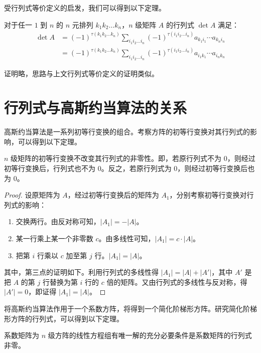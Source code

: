 受行列式等价定义的启发，我们可以得到以下定理。

\begin{theorem}
	对于任一 $1$ 到 $n$ 的 $n$ 元排列 $k_1 k_2 \ldots k_n$，$n$ 级矩阵 $A$ 的行列式 $\det A$ 满足：
	$$
	\begin{aligned}
		\det A &= (-1)^{\tau(k_1 k_2 \ldots k_n)} \sum\limits_{i_1 i_2 \ldots i_n} (-1)^{\tau (i_1 i_2 \ldots i_n)} a_{k_1 i_1} \cdots a_{k_n i_n}
		\\&=
		(-1)^{\tau(k_1 k_2 \ldots k_n)} \sum\limits_{i_1 i_2 \ldots i_n} (-1)^{\tau (i_1 i_2 \ldots i_n)} a_{i_1 k_1} \cdots a_{i_n k_n}
	\end{aligned}
	$$
\end{theorem}

证明略，思路与上文行列式等价定义的证明类似。

\section{行列式与高斯约当算法的关系}

高斯约当算法是一系列初等行变换的组合。考察方阵的初等行变换对其行列式的影响，可以得到以下定理。

\begin{theorem}
	$n$ 级矩阵的初等行变换不改变其行列式的非零性。即，若原行列式不为 $0$，则经过初等行变换后，行列式也不为 $0$。反之，若原行列式为 $0$，则经过初等行变换后也为 $0$。
\end{theorem}

\begin{proof}
	设原矩阵为 $A$，经过初等行变换后的矩阵为 $A_1$，分别考察初等行变换对行列式的影响：
	\begin{enumerate}
		\item 交换两行。由反对称可知，$|A_1| = -|A|$。
		\item 某一行乘上某一个非零数 $c$。由多线性可知，$|A_1| = c \cdot |A|$。
		\item 把第 $i$ 行乘以 $c$ 加至第 $j$ 行。$|A_1| = |A|$。
	\end{enumerate}

	其中，第三点的证明如下。利用行列式的多线性得 $|A_1| = |A| + |A'|$，其中 $A'$ 是把 $A$ 的第 $j$ 行替换为第 $i$ 行的 $c$ 倍的矩阵。又由行列式的多线性与反对称，得 $|A'| = 0$，即证得 $|A_1| = |A|$。
\end{proof}

将高斯约当算法作用于一个系数方阵，将得到一个简化阶梯形方阵。研究简化阶梯形方阵的行列式，可以得到以下定理。

\begin{theorem}
	系数矩阵为 $n$ 级方阵的线性方程组有唯一解的充分必要条件是系数矩阵的行列式非零。
\end{theorem}

